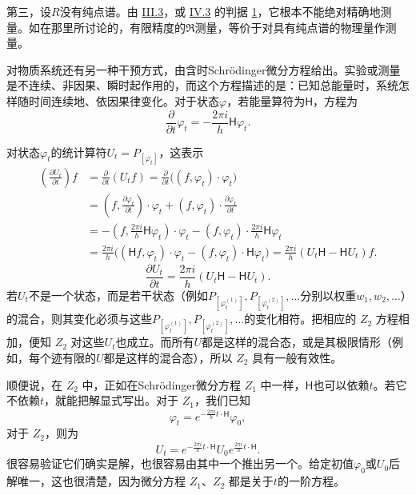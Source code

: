 \documentclass[fontsize=13pt,twoside,openany,headings=normal,parskip=false,bookmarkpackage=false,DIV=calc]{scrbook}
\begin{document}
第三，设$R$没有纯点谱。由 \hyperref[sec:III.3]{III.3}，或 \hyperref[sec:IV.3]{IV.3} 的判据 \hyperref[criterion:IV.3.1]{1}，它根本不能绝对精确地测量。如在那里所讨论的，有限精度的$\mathfrak R$测量，等价于对具有纯点谱的物理量作测量。

对物质系统还有另一种干预方式，由含时Schr\"odinger微分方程给出。实验或测量是不连续、非因果、瞬时起作用的，而这个方程描述的是：已知总能量时，系统怎样随时间连续地、依因果律变化。对于状态$\varphi$，若能量算符为$\mathsf{H}$，方程为
\begin{equation}\tag{$Z_1$}\label{eq:V.1.Z1}
\frac{\partial}{\partial t}\varphi_t=-\frac{2\pi i}{h}\mathsf{H}\varphi_t.
\end{equation}

\hypertarget{origpage-186}{}\label{origpage-186}对状态$\varphi_t$的统计算符$U_t=P_{[\varphi_t]}$，这表示
\begin{align*}
\left(\frac{\partial U_t}{\partial t}\right)f
&=\frac{\partial}{\partial t}(U_tf)
=\frac{\partial}{\partial t}\bigl((f,\varphi_t)\cdot\varphi_t\bigr)\\
&=\left(f,\frac{\partial\varphi_t}{\partial t}\right)\cdot\varphi_t
+(f,\varphi_t)\cdot\frac{\partial\varphi_t}{\partial t}\\
&=-\left(f,\frac{2\pi i}{h}\mathsf{H}\varphi_t\right)\cdot\varphi_t
-(f,\varphi_t)\cdot\frac{2\pi i}{h}\mathsf{H}\varphi_t\\
&=\frac{2\pi i}{h}\bigl((\mathsf{H}f,\varphi_t)\cdot\varphi_t-(f,\varphi_t)\cdot\mathsf{H}\varphi_t\bigr)
=\frac{2\pi i}{h}(U_t\mathsf{H}-\mathsf{H}U_t)f.
\end{align*}
\begin{equation}\tag{$Z_2$}\label{eq:V.1.Z2}
\frac{\partial U_t}{\partial t}=\frac{2\pi i}{h}(U_t\mathsf{H}-\mathsf{H}U_t).
\end{equation}
若$U_t$不是一个状态，而是若干状态（例如$P_{[\varphi_t^{(1)}]},\allowbreak P_{[\varphi_t^{(2)}]},\allowbreak \ldots$分别以权重$w_1,\allowbreak w_2,\allowbreak \ldots$）的混合，则其变化必须与这些$P_{[\varphi_t^{(1)}]},\allowbreak P_{[\varphi_t^{(2)}]},\allowbreak \ldots$的变化相符。把相应的 \hyperref[eq:V.1.Z2]{$Z_2$} 方程相加，便知 \hyperref[eq:V.1.Z2]{$Z_2$} 对这些$U_t$也成立。而所有$U$都是这样的混合态，或是其极限情形（例如，每个迹有限的$U$都是这样的混合态），所以 \hyperref[eq:V.1.Z2]{$Z_2$} 具有一般有效性。

顺便说，在 \hyperref[eq:V.1.Z2]{$Z_2$} 中，正如在Schr\"odinger微分方程 \hyperref[eq:V.1.Z1]{$Z_1$} 中一样，$\mathsf{H}$也可以依赖$t$。若它不依赖$t$，就能把解显式写出。对于 \hyperref[eq:V.1.Z1]{$Z_1$}，我们已知
\begin{equation}\tag{$Z'_1$}\label{eq:V.1.Z1prime}
\varphi_t=e^{-\frac{2\pi i}{h}t\cdot\mathsf{H}}\varphi_0,
\end{equation}
对于 \hyperref[eq:V.1.Z2]{$Z_2$}，则为
\begin{equation}\tag{$Z'_2$}\label{eq:V.1.Z2prime}
U_t=e^{-\frac{2\pi i}{h}t\cdot\mathsf{H}}U_0e^{\frac{2\pi i}{h}t\cdot\mathsf{H}}.
\end{equation}
很容易验证它们确实是解，也很容易由其中一个推出另一个。给定初值$\varphi_0$或$U_0$后解唯一，这也很清楚，因为微分方程 \hyperref[eq:V.1.Z1]{$Z_1$}、\hyperref[eq:V.1.Z2]{$Z_2$} 都是关于$t$的一阶方程。
\end{document}
